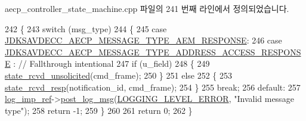 aecp\+\_\+controller\+\_\+state\+\_\+machine.\+cpp 파일의 241 번째 라인에서 정의되었습니다.


\begin{DoxyCode}
242 \{
243     \textcolor{keywordflow}{switch} (msg\_type)
244     \{
245     \textcolor{keywordflow}{case} \hyperlink{group__aecp__message__type_ga9cad401e0f60634a8f084d93b0374d31}{JDKSAVDECC\_AECP\_MESSAGE\_TYPE\_AEM\_RESPONSE}:
246     \textcolor{keywordflow}{case} \hyperlink{group__aecp__message__type_ga4d8df21361c95f23016e03d0ef625dc0}{JDKSAVDECC\_AECP\_MESSAGE\_TYPE\_ADDRESS\_ACCESS\_RESPONSE}
      : \textcolor{comment}{// Fallthrough intentional}
247         \textcolor{keywordflow}{if} (u\_field)
248         \{
249             \hyperlink{classavdecc__lib_1_1aecp__controller__state__machine_a02520027d366c215f1e813aece78451e}{state\_rcvd\_unsolicited}(cmd\_frame);
250         \}
251         \textcolor{keywordflow}{else}
252         \{
253             \hyperlink{classavdecc__lib_1_1aecp__controller__state__machine_a9a29a329925ab62cdef9e98b2520bed8}{state\_rcvd\_resp}(notification\_id, cmd\_frame);
254         \}
255         \textcolor{keywordflow}{break};
256     \textcolor{keywordflow}{default}:
257         \hyperlink{namespaceavdecc__lib_acbe3e2a96ae6524943ca532c87a28529}{log\_imp\_ref}->\hyperlink{classavdecc__lib_1_1log_a68139a6297697e4ccebf36ccfd02e44a}{post\_log\_msg}(\hyperlink{namespaceavdecc__lib_a501055c431e6872ef46f252ad13f85cdaf2c4481208273451a6f5c7bb9770ec8a}{LOGGING\_LEVEL\_ERROR}, \textcolor{stringliteral}{"Invalid
       message type"});
258         \textcolor{keywordflow}{return} -1;
259     \}
260 
261     \textcolor{keywordflow}{return} 0;
262 \}
\end{DoxyCode}


